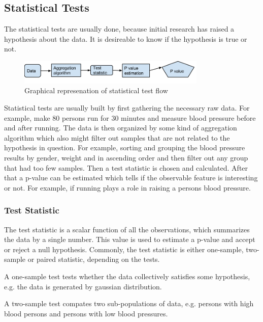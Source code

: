 \documentclass[12pt]{article}
\begin{document}
\subsection{Statistical Tests}

The statistical tests are usually done, because initial research has raised a hypothesis about the data. It is desireable to know if the hypothesis is true or not.

\begin{figure}[H]
  \centering
  \includegraphics[width=0.8\textwidth]{statisticalTestFlow}
  \caption{Graphical represenation of statistical test flow}
  \label{fig:statisticalTestFlow}
\end{figure}

Statistical tests are usually built by first gathering the necessary raw data. For example, make 80 persons run for 30 minutes and measure blood pressure before and after running. The data is then organized by some kind of aggregation algorithm which also might filter out samples that are not related to the hypothesis in question. For example, sorting and grouping the blood pressure results by gender, weight and in ascending order and then filter out any group that had too few samples. Then a test statistic is chosen and calculated. After that a p-value can be estimated which tells if the observable feature is interesting or not. For example, if running plays a role in raising a persons blood pressure.

\subsubsection{Test Statistic}

The test statistic is a scalar function of all the observations, which summarizes the data by a single number. This value is used to estimate a p-value and accept or reject a null hypothesis. Commonly, the test statistic is either one-sample, two-sample or paired statistic, depending on the tests.

A one-sample test tests whether the data collectively satisfies some hypothesis, e.g. the data is generated by gaussian distribution.

A two-sample test compates two sub-populations of data, e.g. persons with high blood persons and persons with low blood pressures.
\end{document}
